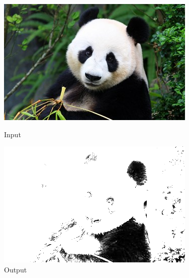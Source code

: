 \documentclass[a4paper,8pt]{article}
\begin{document}
        \begin{figure}[H]
        \centering
        \begin{minipage}{0.4\linewidth}
        \centering
        \includegraphics[width=\linewidth]{output/input1.jpg}
        \caption{Input}
        \end{minipage}
        \hfill
        \begin{minipage}{0.4\linewidth}
        \centering
        \includegraphics[width=\linewidth]{output/Power Law Transformation_output.png}
        \caption{Output}
        \end{minipage}
        \end{figure}
        \clearpage
        
\end{document}
